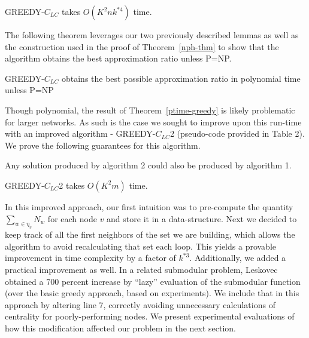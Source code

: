 \begin{thm}\label{ptime-greedy} GREEDY-$C_{LC}$ takes $O(K^2 n k^{*4})$ time.\end{thm}

The following theorem leverages our two previously described lemmas as well as the construction used in the proof of Theorem~\ref{nph-thm} to show that the algorithm obtains the best approximation ratio unless P=NP.

\begin{thm}\label{greedApprox} GREEDY-$C_{LC}$ obtains the best possible approximation ratio in polynomial time unless P=NP\end{thm}

Though polynomial, the result of Theorem~\ref{ptime-greedy} is likely problematic for larger networks.  As such is the case we sought to improve upon this run-time with an improved algorithm - GREEDY-$C_{LC}$2 (pseudo-code provided in Table 2).  We prove the following guarantees for this algorithm.\\

\begin{thm}\label{algequiv} Any solution produced by algorithm 2 could also be produced by algorithm 1. \end{thm}

\begin{thm}\label{timeImp}GREEDY-$C_{LC}$2 takes $O(K^2 m)$ time.\end{thm}

In this improved approach, our first intuition was to pre-compute the quantity $ \sum_{w \in \eta_v} N_w$ for each node $v$ and store it in a data-structure.  Next we decided to keep track of all the first neighbors of the set we are building, which allows the algorithm to avoid recalculating that set each loop.  This yields a provable improvement in time complexity by a factor of $k^{*3}$.  Additionally, we added a practical improvement as well.  In a related submodular problem, Leskovec ~\cite{leskovec07} obtained a $700$ percent increase by ``lazy'' evaluation of the submodular function (over the basic greedy approach, based on experiments).  We include that in this approach by altering line 7, correctly avoiding unnecessary calculations of centrality for poorly-performing nodes. We present experimental evaluations of how this modification affected our problem in the next section.


